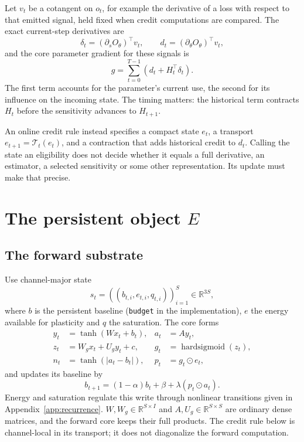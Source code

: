 \documentclass[11pt]{article}
\theoremstyle{definition}
\newcommand{\R}{\mathbb R}
\newcommand{\Had}{\odot}
\begin{document}
Let $v_t$ be a cotangent on $o_t$, for example the derivative of a loss with
respect to that emitted signal, held fixed when credit computations are compared.
The exact current-step derivatives are
\begin{equation}
 \delta_t=(\partial_s O_\theta)^\top v_t,\qquad
 d_t=(\partial_\theta O_\theta)^\top v_t,
 \label{eq:local-vjp}
\end{equation}
and the core parameter gradient for these signals is
\begin{equation}
 g=\sum_{t=0}^{T-1}\left(d_t+H_t^\top\delta_t\right).
 \label{eq:full-gradient}
\end{equation}
The first term accounts for the parameter's current use, the second for its
influence on the incoming state. The timing matters: the historical term contracts
$H_t$ before the sensitivity advances to $H_{t+1}$.

An online credit rule instead specifies a compact state $e_t$, a transport
$e_{t+1}=\mathcal T_t(e_t)$, and a contraction that adds historical credit to
$d_t$. Calling the state an eligibility does not decide whether it equals a full
derivative, an estimator, a selected sensitivity or some other representation.
Its update must make that precise.

\section{The persistent object $E$}
\label{sec:method}

\subsection{The forward substrate}

Use channel-major state
\begin{equation}
 s_t=((b_{t,i},e_{t,i},q_{t,i}))_{i=1}^S\in\R^{3S},
\end{equation}
where $b$ is the persistent baseline (\texttt{budget} in the implementation), $e$
the energy available for plasticity and $q$ the saturation. The core forms
\begin{align}
 y_t&=\tanh(Wx_t+b_t), & a_t&=Ay_t,\\
 z_t&=W_gx_t+U_gy_t+c, & g_t&=\operatorname{hardsigmoid}(z_t),\\
 n_t&=\tanh(|a_t-b_t|), & p_t&=g_t\Had e_t,
 \label{eq:forward-core}
\end{align}
and updates its baseline by
\begin{equation}
 b_{t+1}=(1-\alpha)b_t+\beta+\lambda(p_t\Had a_t).
 \label{eq:budget}
\end{equation}
Energy and saturation regulate this write through nonlinear transitions given in
Appendix~\ref{app:recurrence}. $W,W_g\in\R^{S\times I}$ and $A,U_g\in\R^{S\times S}$
are ordinary dense matrices, and the forward core keeps their full products. The
credit rule below is channel-local in its transport; it does not diagonalize the
forward computation.
\end{document}
